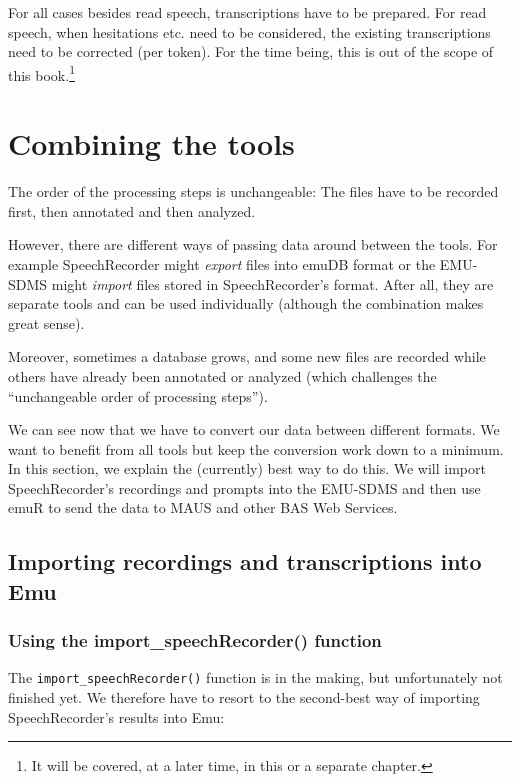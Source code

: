 \documentclass[]{book}
\let\rmarkdownfootnote\footnote%
\def\footnote{\protect\rmarkdownfootnote}
\theoremstyle{definition}
\theoremstyle{definition}
\theoremstyle{definition}
\theoremstyle{remark}
\begin{document}
For all cases besides read speech, transcriptions have to be prepared.
For read speech, when hesitations etc. need to be considered, the
existing transcriptions need to be corrected (per token). For the time
being, this is out of the scope of this book.\footnote{It will be
  covered, at a later time, in this or a separate chapter.}

\section{Combining the tools}\label{combining-the-tools}

The order of the processing steps is unchangeable: The files have to be
recorded first, then annotated and then analyzed.

However, there are different ways of passing data around between the
tools. For example SpeechRecorder might \emph{export} files into emuDB
format or the EMU-SDMS might \emph{import} files stored in
SpeechRecorder's format. After all, they are separate tools and can be
used individually (although the combination makes great sense).

Moreover, sometimes a database grows, and some new files are recorded
while others have already been annotated or analyzed (which challenges
the ``unchangeable order of processing steps'').

We can see now that we have to convert our data between different
formats. We want to benefit from all tools but keep the conversion work
down to a minimum. In this section, we explain the (currently) best way
to do this. We will import SpeechRecorder's recordings and prompts into
the EMU-SDMS and then use emuR to send the data to MAUS and other BAS
Web Services.

\subsection{Importing recordings and transcriptions into
Emu}\label{importing-recordings-and-transcriptions-into-emu}

\subsubsection{Using the import\_speechRecorder()
function}\label{using-the-import_speechrecorder-function}

The \texttt{import\_speechRecorder()} function is in the making, but
unfortunately not finished yet. We therefore have to resort to the
second-best way of importing SpeechRecorder's results into Emu:
\end{document}
